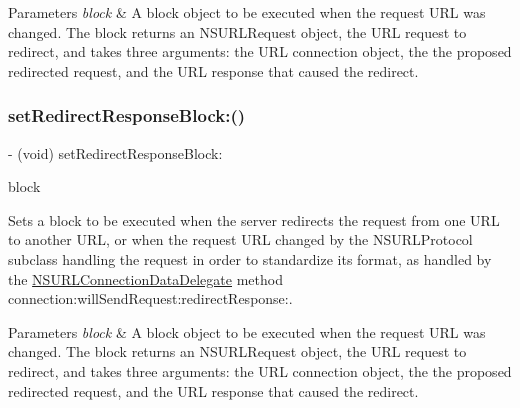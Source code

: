 \begin{DoxyParams}{Parameters}
{\em block} & A block object to be executed when the request U\+RL was changed. The block returns an {\ttfamily N\+S\+U\+R\+L\+Request} object, the U\+RL request to redirect, and takes three arguments\+: the U\+RL connection object, the the proposed redirected request, and the U\+RL response that caused the redirect. \\
\hline
\end{DoxyParams}
\mbox{\label{interface_a_f_u_r_l_connection_operation_a844f5a93caf867e8c11dbae1cedb5e2f}} 
\subsubsection{\texorpdfstring{set\+Redirect\+Response\+Block\+:()}{setRedirectResponseBlock:()}\hspace{0.1cm}{\footnotesize\ttfamily [2/3]}}
{\footnotesize\ttfamily -\/ (void) set\+Redirect\+Response\+Block\+: \begin{DoxyParamCaption}\item[{(nullable N\+S\+U\+R\+L\+Request $\ast$($^\wedge$)(N\+S\+U\+R\+L\+Connection $\ast$connection, N\+S\+U\+R\+L\+Request $\ast$\mbox{\hyperlink{interface_a_f_u_r_l_connection_operation_a396bdfca5d7ad65dbface0a6df2c207c}{request}}, N\+S\+U\+R\+L\+Response $\ast$redirect\+Response))}]{block }\end{DoxyParamCaption}}

Sets a block to be executed when the server redirects the request from one U\+RL to another U\+RL, or when the request U\+RL changed by the {\ttfamily N\+S\+U\+R\+L\+Protocol} subclass handling the request in order to standardize its format, as handled by the {\ttfamily \mbox{\hyperlink{class_n_s_u_r_l_connection_data_delegate-p}{N\+S\+U\+R\+L\+Connection\+Data\+Delegate}}} method {\ttfamily connection\+:will\+Send\+Request\+:redirect\+Response\+:}.


\begin{DoxyParams}{Parameters}
{\em block} & A block object to be executed when the request U\+RL was changed. The block returns an {\ttfamily N\+S\+U\+R\+L\+Request} object, the U\+RL request to redirect, and takes three arguments\+: the U\+RL connection object, the the proposed redirected request, and the U\+RL response that caused the redirect. \\
\hline
\end{DoxyParams}
\mbox{\label{interface_a_f_u_r_l_connection_operation_a844f5a93caf867e8c11dbae1cedb5e2f}} 
